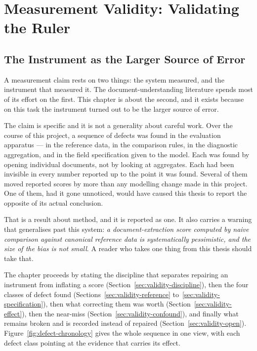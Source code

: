 \chapter{Measurement Validity: Validating the Ruler}
\label{ch:measurement-validity}

\section{The Instrument as the Larger Source of Error}
\label{sec:validity-why}

A measurement claim rests on two things: the system measured, and the instrument that measured
it. The document-understanding literature spends most of its effort on the first. This chapter
is about the second, and it exists because on this task the instrument turned out to be the
larger source of error.

The claim is specific and it is not a generality about careful work. Over the course of this
project, a sequence of defects was found in the evaluation apparatus --- in the reference data,
in the comparison rules, in the diagnostic aggregation, and in the field specification given to
the model. Each was found by opening individual documents, not by looking at aggregates.
Each had been invisible in every number reported up to the point it was found. Several of them
moved reported scores by more than any modelling change made in this project. One of them, had
it gone unnoticed, would have caused this thesis to report the opposite of its actual
conclusion.

That is a result about method, and it is reported as one. It also carries a warning that
generalises past this system: \emph{a document-extraction score computed by naive comparison
against canonical reference data is systematically pessimistic, and the size of the bias is not
small}. A reader who takes one thing from this thesis should take that.

The chapter proceeds by stating the discipline that separates repairing an instrument from
inflating a score (Section~\ref{sec:validity-discipline}), then the four classes of defect found
(Sections~\ref{sec:validity-reference} to~\ref{sec:validity-specification}), then what correcting them
was worth (Section~\ref{sec:validity-effect}), then the near-miss
(Section~\ref{sec:validity-confound}), and finally what remains broken and is recorded instead of
repaired (Section~\ref{sec:validity-open}). Figure~\ref{fig:defect-chronology} gives the whole
sequence in one view, with each defect class pointing at the evidence that carries its
effect.

